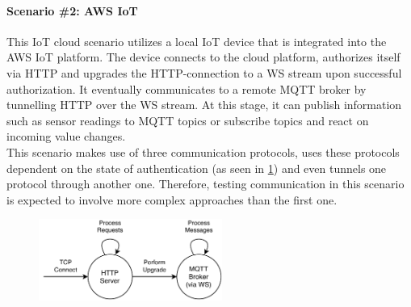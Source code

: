 \paragraph{Scenario \#2: \ac{AWS} \ac{IoT}} This \ac{IoT} cloud scenario utilizes a local \ac{IoT} device that is integrated into the \ac{AWS} \ac{IoT} platform. The device connects to the cloud platform, authorizes itself via \ac{HTTP} and upgrades the \ac{HTTP}-connection to a \ac{WS} stream upon successful authorization. It eventually communicates to a remote \ac{MQTT} broker by tunnelling \ac{HTTP} over the \ac{WS} stream. At this stage, it can publish information such as sensor readings to \ac{MQTT} topics or subscribe topics and react on incoming value changes. \\
This scenario makes use of three communication protocols, uses these protocols dependent on the state of authentication (as seen in \ref{fig:aws-statemachine}) and even tunnels one protocol through another one. Therefore, testing communication in this scenario is expected to involve more complex approaches than the first one. %

\begin{figure}[ht] 
    \centering
    \includegraphics[width=6cm]{img/ch04/Statemachine 2.pdf}
    \label{fig:aws-statemachine}
\end{figure}


